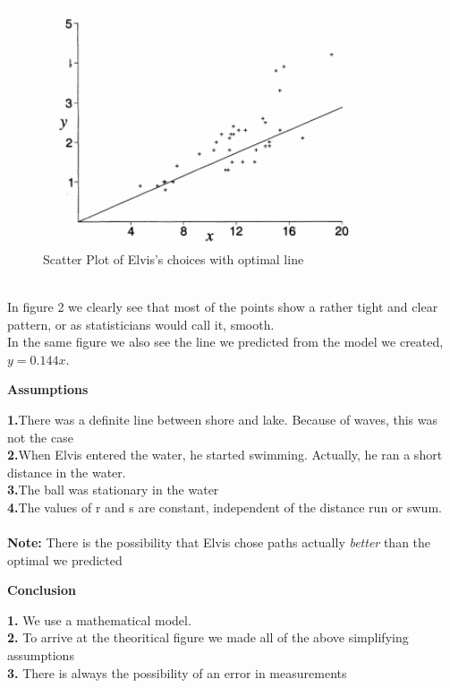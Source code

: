 \documentclass[12pt]{article}
\begin{document}
{\begin{figure}[h!]
  \begin{center}
  \includegraphics[width=100mm]{ElvisChoice.png}
  \caption{Scatter Plot of Elvis's choices with optimal line}
  \label{fig:path3}
  \end{center}
\end{figure}\\

In figure 2 we clearly see that most of the points show a rather tight and clear pattern, or as statisticians would call it, smooth. \\In the same figure we also see the line we predicted from the model we created, $y = 0.144x.$ \newpage
\begin{center}
\textbf{Assumptions}\\
\end{center}
\textbf{1.}There was a definite line between shore and lake. Because of waves, this
was not the case\\
\textbf{2.}When Elvis entered the water, he started swimming. Actually, he
ran a short distance in the water.\\
\textbf{3.}The ball was stationary in the water\\
\textbf{4.}The values of r and s are constant, independent of the distance run
or swum.\\ \\
\textbf{Note:} There is the possibility that Elvis chose paths actually \textit{better} than the optimal we predicted\\
\begin{center}
\textbf{Conclusion}\\
\end{center}
\textbf{1.} We use a mathematical model.\\
\textbf{2.} To arrive at the theoritical figure we made all of the above simplifying assumptions\\
\textbf{3.} There is always the possibility of an error in measurements\\

}
\end{document}
